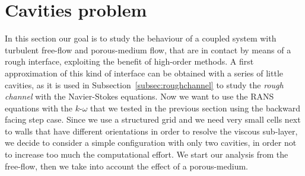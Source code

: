 \FloatBarrier
\section{Cavities problem}
In this section our goal is to study the behaviour of a coupled system with turbulent free-flow and 
porous-medium flow, that are in contact by means of a rough interface, exploiting the benefit of high-order methods. A first approximation of this kind of interface can be obtained with a series of little
cavities, as it is used in Subsection~\ref{subsec:roughchannel} to study the \emph{rough channel} with the 
Navier-Stokes equations. Now we want to use the RANS equations with the $k\text{-}\omega$ that we tested in the previous section using the backward facing step case.
Since we use a structured grid and we need very small cells next to walls that have different orientations in order to resolve the viscous sub-layer, we decide to consider a simple configuration with only two cavities, in order not to increase too much the computational effort. We start our analysis from the free-flow, then we take into account the effect of a porous-medium.
%
